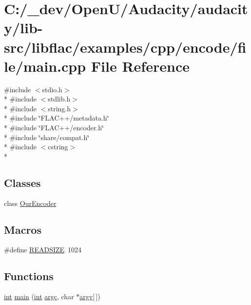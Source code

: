 \hypertarget{lib-src_2libflac_2examples_2cpp_2encode_2file_2main_8cpp}{}\section{C\+:/\+\_\+dev/\+Open\+U/\+Audacity/audacity/lib-\/src/libflac/examples/cpp/encode/file/main.cpp File Reference}
\label{lib-src_2libflac_2examples_2cpp_2encode_2file_2main_8cpp}
{\ttfamily \#include $<$stdio.\+h$>$}\\*
{\ttfamily \#include $<$stdlib.\+h$>$}\\*
{\ttfamily \#include $<$string.\+h$>$}\\*
{\ttfamily \#include \char`\"{}F\+L\+A\+C++/metadata.\+h\char`\"{}}\\*
{\ttfamily \#include \char`\"{}F\+L\+A\+C++/encoder.\+h\char`\"{}}\\*
{\ttfamily \#include \char`\"{}share/compat.\+h\char`\"{}}\\*
{\ttfamily \#include $<$cstring$>$}\\*
\subsection*{Classes}
\begin{DoxyCompactItemize}
\item 
class \hyperlink{class_our_encoder}{Our\+Encoder}
\end{DoxyCompactItemize}
\subsection*{Macros}
\begin{DoxyCompactItemize}
\item 
\#define \hyperlink{lib-src_2libflac_2examples_2cpp_2encode_2file_2main_8cpp_a54bf24043fc6dd562b2ce3597993943c}{R\+E\+A\+D\+S\+I\+ZE}~1024
\end{DoxyCompactItemize}
\subsection*{Functions}
\begin{DoxyCompactItemize}
\item 
\hyperlink{xmltok_8h_a5a0d4a5641ce434f1d23533f2b2e6653}{int} \hyperlink{lib-src_2libflac_2examples_2cpp_2encode_2file_2main_8cpp_a0ddf1224851353fc92bfbff6f499fa97}{main} (\hyperlink{xmltok_8h_a5a0d4a5641ce434f1d23533f2b2e6653}{int} \hyperlink{cmdline_8c_aaffeb1bf2056ea44af5b5d0ee4d6ff07}{argc}, char $\ast$\hyperlink{cmdline_8c_ad407d5ba91709bd9b092003858600723}{argv}\mbox{[}$\,$\mbox{]})
\end{DoxyCompactItemize}


